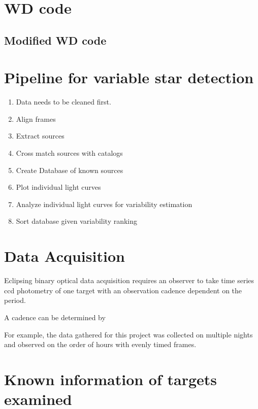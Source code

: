 \section{WD code}
\subsection{Modified WD code}

\section{Pipeline for variable star detection}
\begin{enumerate}
    \item Data needs to be cleaned first.
    \item Align frames
    \item Extract sources
    \item Cross match sources with catalogs
    \item Create Database of known sources
    \item Plot individual light curves
    \item Analyze individual light curves for variability estimation
    \item Sort database given variability ranking
\end{enumerate}




\section{Data Acquisition}
Eclipsing binary optical data acquisition requires an observer to take time series ccd photometry of one target with an observation cadence dependent on the period.

A cadence can be determined by 

For example, the data gathered for this project was collected on multiple nights and observed on the order of hours with evenly timed frames.

\section{Known information of targets examined}


